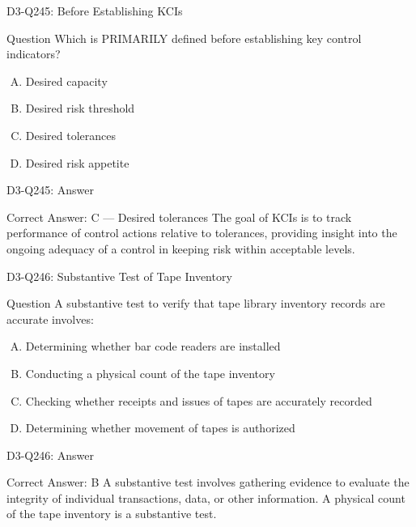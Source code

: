 \documentclass{beamer}
\begin{document}
	\begin{frame}{D3-Q245: Before Establishing KCIs}
		\begin{block}{Question}
			Which is PRIMARILY defined before establishing key control indicators?
		\end{block}
		\begin{enumerate}[(A)]
			\item Desired capacity
			\item Desired risk threshold
			\item Desired tolerances
			\item Desired risk appetite
		\end{enumerate}
	\end{frame}
	\begin{frame}{D3-Q245: Answer}
		\begin{block}{Correct Answer: C --- Desired tolerances}
			The goal of KCIs is to track performance of control actions relative to tolerances, providing insight into the ongoing adequacy of a control in keeping risk within acceptable levels.
		\end{block}
	\end{frame}
	
	\begin{frame}{D3-Q246: Substantive Test of Tape Inventory}
		\begin{block}{Question}
			A substantive test to verify that tape library inventory records are accurate involves:
		\end{block}
		\begin{enumerate}[(A)]
			\item Determining whether bar code readers are installed
			\item Conducting a physical count of the tape inventory
			\item Checking whether receipts and issues of tapes are accurately recorded
			\item Determining whether movement of tapes is authorized
		\end{enumerate}
	\end{frame}
	\begin{frame}{D3-Q246: Answer}
		\begin{block}{Correct Answer: B}
			A substantive test involves gathering evidence to evaluate the integrity of individual transactions, data, or other information. A physical count of the tape inventory is a substantive test.
		\end{block}
	\end{frame}
	
\end{document}
